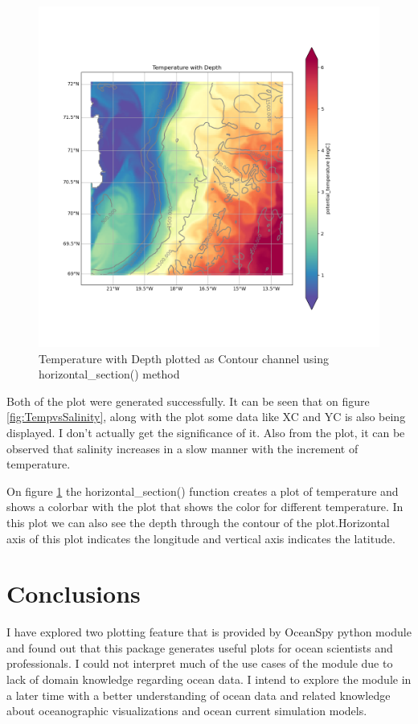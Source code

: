 \documentclass[12pt, letterpaper]{article}
\begin{document}
\begin{figure}
\includegraphics[width=1\textwidth]{TempwithDepth}
\caption{Temperature with Depth plotted as Contour channel using horizontal\_section() method}
\label{fig:TempwithDepth}
\end{figure}

Both of the plot were generated successfully. It can be seen that on figure \ref{fig:TempvsSalinity}, along with the plot some data like XC and YC is also being displayed. I don't actually get the significance of it. Also from the plot, it can be observed that salinity increases in a slow manner with the increment of temperature. 

On figure \ref{fig:TempwithDepth} the horizontal\_section() function creates a plot of temperature and shows a colorbar with the plot that shows the color for different temperature. In this plot we can also see the depth through the contour of the plot.Horizontal axis of this plot indicates the longitude and vertical axis indicates the latitude. 












\section{Conclusions}
I have explored two plotting feature that is provided by OceanSpy python module and found out that this package generates useful plots for ocean scientists and professionals. I could not interpret much of the use cases of the module due to lack of domain knowledge regarding ocean data. I intend to explore the module in a later time with a better understanding of ocean data and related knowledge about oceanographic visualizations and ocean current simulation models.
\end{document}
